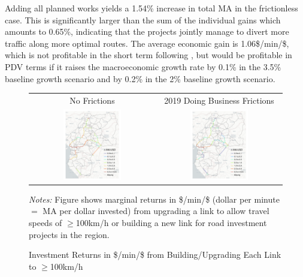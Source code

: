 \documentclass[a4paper]{article}
\begin{document}
Adding all planned works yields a 1.54\% increase in total MA in the frictionless case. This is significantly larger than the sum of the individual gains which amounts to 0.65\%, indicating that the projects jointly manage to divert more traffic along more optimal routes. The average economic gain is 1.06\$/min/\$, which is not profitable in the short term following \citet{donaldson2016railroads}, but would be profitable in PDV terms if it raises the macroeconomic growth rate by 0.1\% in the 3.5\% baseline growth scenario and by 0.2\% in the 2\% baseline growth scenario.


\begin{figure}[H]  \vspace{-1mm}
\centering
\caption{\label{fig:MA_TT_PUSD} Investment Returns in \$/min/\$ from Building/Upgrading Each Link to $\geq$100km/h}
\vspace{2mm}
\begin{tabular}{cc}
No Frictions & 2019 Doing Business Frictions \\
\includegraphics[width=0.48\textwidth]{"../figures/PE/trans_CEMAC_network_MA_gain_all_100kmh_pusd_planned_projects.pdf"} &
\includegraphics[width=0.48\textwidth]{"../figures/PE/trans_CEMAC_network_MA_gain_all_100kmh_pusd_bt_planned_projects.pdf"}  \\ [-0.2em]
\end{tabular}
\raggedright
\scriptsize 
\emph{Notes:} Figure shows marginal returns in \$/min/\$ (dollar per minute $=$ MA per dollar invested) from upgrading a link to allow travel speeds of $\geq$100km/h or building a new link for road investment projects in the region.
\end{figure}
\end{document}
